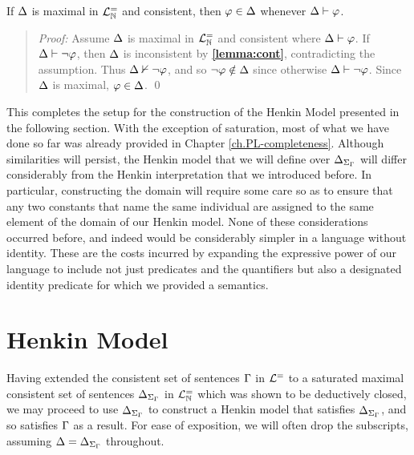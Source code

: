\begin{Lthm} \label{lemma:deductive}
  If $\Delta$ is maximal in $\mathcal{L}^{=}_{\mathbb{N}}$ and consistent, then $\varphi\in\Delta$ whenever $\Delta\vdash\varphi$.
\end{Lthm}

\begin{quote} 
  \textit{Proof:} Assume $\Delta$ is maximal in $\mathcal{L}^{=}_{\mathbb{N}}$ and consistent where $\Delta\vdash\varphi$.
  If $\Delta\vdash\neg\varphi$, then $\Delta$ is inconsistent by \textbf{\ref{lemma:cont}}, contradicting the assumption.
  Thus $\Delta\nvdash\neg\varphi$, and so $\neg\varphi\notin\Delta$ since otherwise $\Delta\vdash\neg\varphi$. 
  Since $\Delta$ is maximal, $\varphi\in\Delta$. 
  \qed
\end{quote}

This completes the setup for the construction of the Henkin Model presented in the following section.
With the exception of saturation, most of what we have done so far was already provided in Chapter \ref{ch.PL-completeness}.
Although similarities will persist, the Henkin model that we will define over $\Delta_{\Sigma_{\Gamma}}$ will differ considerably from the Henkin interpretation that we introduced before. 
In particular, constructing the domain will require some care so as to ensure that any two constants that name the same individual are assigned to the same element of the domain of our Henkin model.
None of these considerations occurred before, and indeed would be considerably simpler in a language without identity.
These are the costs incurred by expanding the expressive power of our language to include not just predicates and the quantifiers but also a designated identity predicate for which we provided a semantics.





\section{Henkin Model}%
  \label{sub:HenkinModel}

Having extended the consistent set of sentences $\Gamma$ in $\mathcal{L}^{=}$ to a saturated maximal consistent set of sentences $\Delta_{\Sigma_{\Gamma}}$ in $\mathcal{L}^{=}_{\mathbb{N}}$ which was shown to be deductively closed, we may proceed to use $\Delta_{\Sigma_{\Gamma}}$ to construct a Henkin model that satisfies $\Delta_{\Sigma_{\Gamma}}$, and so satisfies $\Gamma$ as a result.
For ease of exposition, we will often drop the subscripts, assuming $\Delta=\Delta_{\Sigma_{\Gamma}}$ throughout.

